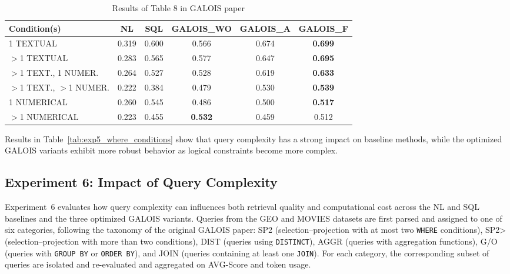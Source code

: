 \documentclass[11pt]{article}
\begin{document}
\begin{table}[htbp]
\centering
\caption{Results of Table 8 in GALOIS paper}
\label{tab:exp_conditions}
\begin{tabular}{lccccc}
\hline
\textbf{Condition(s)} & \textbf{NL} & \textbf{SQL} & \textbf{GALOIS\_WO} & \textbf{GALOIS\_A} & \textbf{GALOIS\_F} \\
\hline
1 TEXTUAL             & 0.319 & 0.600 & 0.566 & 0.674 & \textbf{0.699} \\
$>$1 TEXTUAL          & 0.283 & 0.565 & 0.577 & 0.647 & \textbf{0.695} \\
$>$1 TEXT., 1 NUMER.  & 0.264 & 0.527 & 0.528 & 0.619 & \textbf{0.633} \\
$>$1 TEXT., $>$1 NUMER. & 0.222 & 0.384 & 0.479 & 0.530 & \textbf{0.539} \\
1 NUMERICAL           & 0.260 & 0.545 & 0.486 & 0.500 & \textbf{0.517} \\
$>$1 NUMERICAL        & 0.223 & 0.455 & \textbf{0.532} & 0.459 & 0.512 \\
\hline
\end{tabular}
\end{table}


Results in Table~\ref{tab:exp5_where_conditions} show that query complexity has a strong impact on baseline methods, while the optimized GALOIS variants exhibit more robust behavior as logical constraints become more complex.

\subsection{Experiment 6: Impact of Query Complexity}

Experiment~6 evaluates how query complexity can influences both retrieval quality and computational cost across the NL and SQL baselines and the three optimized GALOIS variants. Queries from the GEO and MOVIES datasets are first parsed and assigned to one of six categories, following the taxonomy of the original GALOIS paper: SP2 (selection–projection with at most two \texttt{WHERE} conditions), SP2> (selection–projection with more than two conditions), DIST (queries using \texttt{DISTINCT}), AGGR (queries with aggregation functions), G/O (queries with \texttt{GROUP BY} or \texttt{ORDER BY}), and JOIN (queries containing at least one \texttt{JOIN}). For each category, the corresponding subset of queries are isolated and re-evaluated and aggregated on AVG-Score and token usage.
\end{document}
